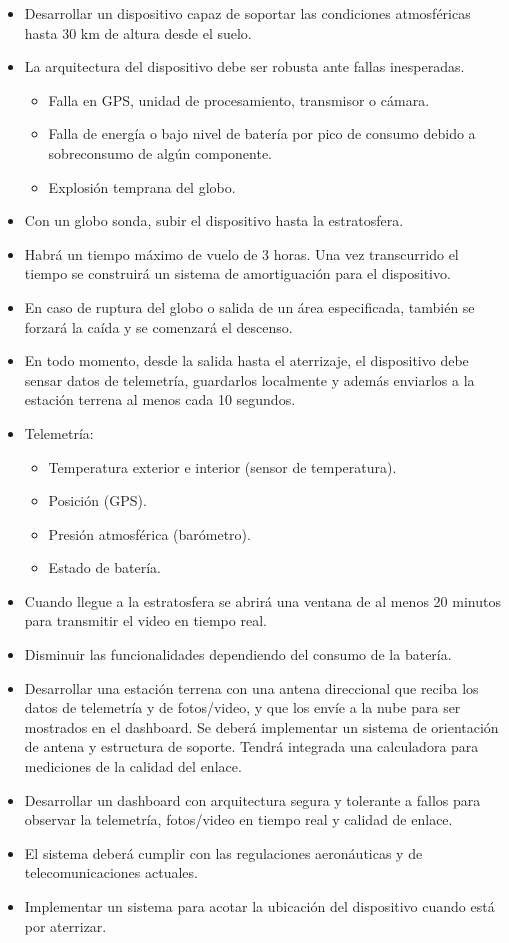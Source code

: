 \documentclass[12pt,a4paper]{article}
\begin{document}
\begin{itemize}
\item
  Desarrollar un dispositivo capaz de soportar las condiciones atmosféricas hasta 30 km de altura desde el suelo.
\item
  La arquitectura del dispositivo debe ser robusta ante fallas inesperadas.
  \begin{itemize}
  \item
    Falla en GPS, unidad de procesamiento, transmisor o cámara.
  \item
    Falla de energía o bajo nivel de batería por pico de consumo debido a sobreconsumo de algún componente.
  \item
    Explosión temprana del globo.
  \end{itemize}
\item
  Con un globo sonda, subir el dispositivo hasta la estratosfera.
\item
  Habrá un tiempo máximo de vuelo de 3 horas. Una vez transcurrido el tiempo se construirá un sistema de amortiguación para el dispositivo.
\item
  En caso de ruptura del globo o salida de un área especificada, también se forzará la caída y se comenzará el descenso.
\item
  En todo momento, desde la salida hasta el aterrizaje, el dispositivo debe sensar datos de telemetría, guardarlos localmente y además enviarlos a la estación terrena al menos cada 10 segundos.
\item
  Telemetría:
  \begin{itemize}
  \item
    Temperatura exterior e interior (sensor de temperatura).
  \item
    Posición (GPS).
  \item
    Presión atmosférica (barómetro).
  \item
    Estado de batería.
  \end{itemize}
\item
  Cuando llegue a la estratosfera se abrirá una ventana de al menos 20 minutos para transmitir el video en tiempo real.
\item
  Disminuir las funcionalidades dependiendo del consumo de la batería.
\item
  Desarrollar una estación terrena con una antena direccional que reciba los datos de telemetría y de fotos/video, y que los envíe a la nube para ser mostrados en el dashboard. Se deberá implementar un sistema de orientación de antena y estructura de soporte. Tendrá integrada una calculadora para mediciones de la calidad del enlace.
\item
  Desarrollar un dashboard con arquitectura segura y tolerante a fallos para observar la telemetría, fotos/video en tiempo real y calidad de enlace.
\item
  El sistema deberá cumplir con las regulaciones aeronáuticas y de telecomunicaciones actuales.
\item
  Implementar un sistema para acotar la ubicación del dispositivo cuando está por aterrizar.
\end{itemize}
\end{document}

